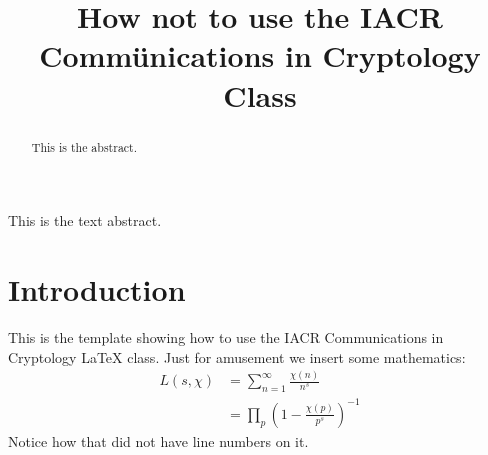 \documentclass[journal=cic,version=final]{iacrj}
\title[running  = {The iacrcc class},
      ]{How not to use the IACR Comm\"unications in Cryptology Class}
\begin{document}
\maketitle

\begin{abstract}
This is the abstract.
\end{abstract}
\begin{textabstract}
This is the text abstract.
\end{textabstract}

\section{Introduction}
This is the template showing how to use the IACR Communications in Cryptology \LaTeX{} class.
Just for amusement we insert some mathematics:
\begin{equation*}
  \begin{split}
    L(s, \chi) & = \sum_{n=1}^{\infty}\frac{\chi(n)}{n^s} \\
    & = \prod_{p} \left(1-\frac{\chi(p)}{p^s}\right)^{-1}
  \end{split}
\end{equation*}
Notice how that did not have line numbers on it.

\lipsum[2-8]
\cite{*}

\end{document}
